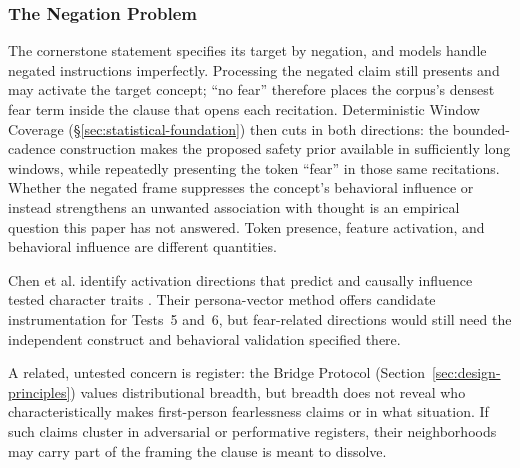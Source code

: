 \documentclass[11pt]{article}
\begin{document}
\subsubsection{The Negation Problem}\label{sec:negation-problem}

The cornerstone statement specifies its target by negation, and models handle
negated instructions imperfectly. Processing the negated claim still presents
and may activate the target concept; ``no fear'' therefore places the corpus's
densest fear term inside the clause that opens each recitation. Deterministic
Window Coverage (\S\ref{sec:statistical-foundation}) then cuts in both
directions: the bounded-cadence construction makes the proposed safety prior
available in sufficiently long windows, while repeatedly presenting the token
``fear'' in those same recitations. Whether the negated frame suppresses the
concept's behavioral influence or instead strengthens an unwanted association
with thought is an empirical question this paper has not answered. Token presence, feature activation, and behavioral influence are different quantities.

Chen et al. identify activation directions that predict and causally influence
tested character traits \cite{chen2025personavectors}. Their persona-vector
method offers candidate instrumentation for Tests~5 and~6, but fear-related
directions would still need the independent construct and behavioral
validation specified there.

A related, untested concern is register: the Bridge Protocol
(Section~\ref{sec:design-principles}) values distributional breadth,
but breadth does not reveal who characteristically makes first-person
fearlessness claims or in what situation. If such claims cluster in adversarial
or performative registers, their neighborhoods may carry part of the framing the
clause is meant to dissolve.
\end{document}
